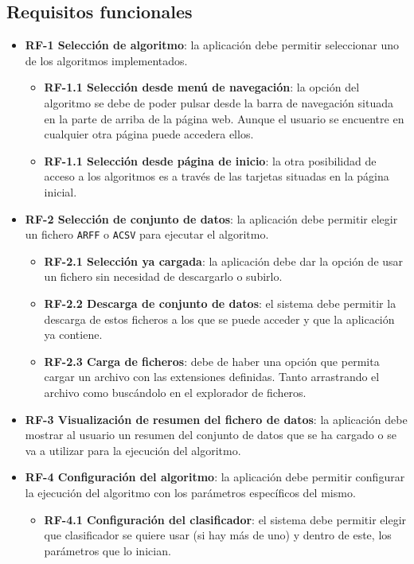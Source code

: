 \subsection{Requisitos funcionales}

\begin{itemize}
	\item \textbf{RF-1 Selección de algoritmo}: la aplicación debe
	permitir seleccionar uno de los algoritmos implementados.
	\begin{itemize}
		\item \textbf{RF-1.1 Selección desde menú de navegación}: la opción del algoritmo se debe de poder pulsar desde la barra de navegación situada en la parte de arriba de la página web. Aunque el usuario se encuentre en cualquier otra página puede accedera ellos.
		\item \textbf{RF-1.1 Selección desde página de inicio}: la otra posibilidad de acceso a los algoritmos es a través de las tarjetas situadas en la página inicial.
	\end{itemize}
	\item \textbf{RF-2 Selección de conjunto de datos}: la aplicación debe
	permitir elegir un fichero \texttt{ARFF} o \texttt{ACSV} para ejecutar el algoritmo.
	\begin{itemize}
		\item \textbf{RF-2.1 Selección ya cargada}: la aplicación debe dar la opción de usar un fichero sin necesidad de descargarlo o subirlo.
		\item \textbf{RF-2.2 Descarga de conjunto de datos}: el sistema debe permitir la descarga de estos ficheros a los que se puede acceder y que la aplicación ya contiene.
		\item \textbf{RF-2.3 Carga de ficheros}: debe de haber una opción que permita cargar un archivo con las extensiones definidas. Tanto arrastrando el archivo como buscándolo en el explorador de ficheros.
	\end{itemize} 
	\item \textbf{RF-3 Visualización de resumen del fichero de datos}: la aplicación debe mostrar al usuario un resumen del conjunto de datos que se ha cargado o se va a utilizar para la ejecución del algoritmo.
	\item \textbf{RF-4 Configuración del algoritmo}: la aplicación debe	permitir configurar la ejecución del algoritmo con los parámetros específicos del mismo.
	\begin{itemize}
		\item \textbf{RF-4.1 Configuración del clasificador}: el sistema debe permitir elegir que clasificador se quiere usar (si hay más de uno) y dentro de este, los parámetros que lo inician.

\end{itemize}
\end{itemize}
